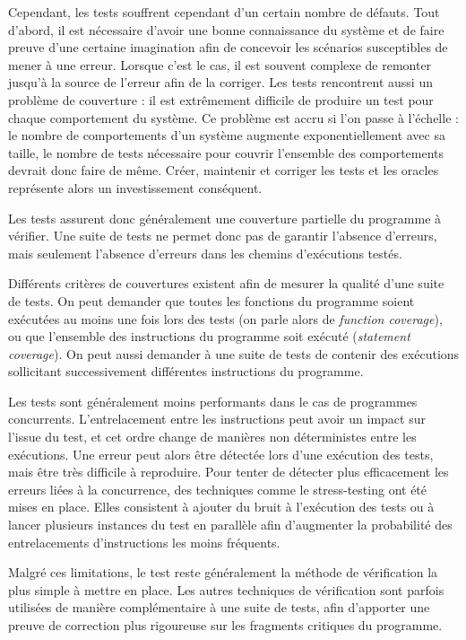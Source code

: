 Cependant, les tests souffrent cependant d'un certain nombre de
défauts. Tout d'abord, il est nécessaire d'avoir une bonne connaissance
du système et de faire preuve d'une certaine imagination afin de
concevoir les scénarios susceptibles de mener à une erreur. Lorsque
c'est le cas, il est souvent complexe de remonter jusqu'à la source de
l'erreur afin de la corriger. Les tests rencontrent aussi un problème de
couverture : il est extrêmement difficile de produire un test pour
chaque comportement du système. Ce problème est accru si l'on passe à
l'échelle : le nombre de comportements d'un système augmente
exponentiellement avec sa taille, le nombre de tests nécessaire pour
couvrir l'ensemble des comportements devrait donc faire de même. Créer, maintenir et
corriger les tests et les oracles représente alors un investissement conséquent.

Les tests assurent donc généralement une couverture partielle du
programme à vérifier. Une suite de tests ne permet donc pas de garantir
l'absence d'erreurs, mais seulement l'absence d'erreurs dans les chemins
d'exécutions testés.

Différents critères de couvertures existent afin de mesurer la qualité
d'une suite de tests. On peut demander que toutes les fonctions du
programme soient exécutées au moins une fois lors des tests (on parle
alors de \emph{function coverage}), ou que l'ensemble des instructions
du programme soit exécuté (\emph{statement coverage}). On peut aussi
demander à une suite de tests de contenir des exécutions sollicitant
successivement différentes instructions du programme.

Les tests sont généralement moins performants dans le cas de programmes
concurrents. L'entrelacement entre les instructions peut avoir un impact
sur l'issue du test, et cet ordre change de manières non déterministes
entre les exécutions. Une erreur peut alors être détectée lors d'une
exécution des tests, mais être très difficile à reproduire. Pour tenter
de détecter plus efficacement les erreurs liées à la concurrence, des
techniques comme le stress-testing ont été mises en place. Elles
consistent à ajouter du bruit à l'exécution des tests ou à lancer
plusieurs instances du test en parallèle afin d'augmenter la probabilité
des entrelacements d'instructions les moins fréquents.

Malgré ces limitations, le test reste généralement la méthode de
vérification la plus simple à mettre en place. Les autres techniques de
vérification sont parfois utilisées de manière complémentaire à une
suite de tests, afin d'apporter une preuve de correction plus rigoureuse
sur les fragments critiques du programme.

